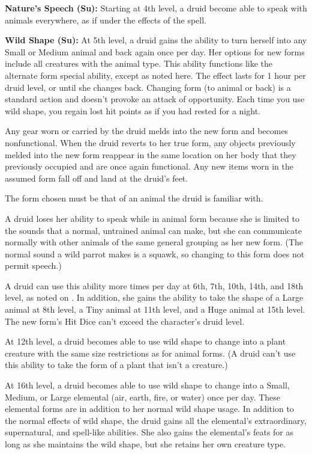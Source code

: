 \textbf{Nature's Speech (Su):} Starting at 4th level, a druid become able to speak with animals everywhere, as if under the effects of the  spell.

\textbf{Wild Shape (Su):} At 5th level, a druid gains the ability to turn herself into any Small or Medium animal and back again once per day. Her options for new forms include all creatures with the animal type. This ability functions like the alternate form special ability, except as noted here. The effect lasts for 1 hour per druid level, or until she changes back. Changing form (to animal or back) is a standard action and doesn't provoke an attack of opportunity. Each time you use wild shape, you regain lost hit points as if you had rested for a night.

Any gear worn or carried by the druid melds into the new form and becomes nonfunctional. When the druid reverts to her true form, any objects previously melded into the new form reappear in the same location on her body that they previously occupied and are once again functional. Any new items worn in the assumed form fall off and land at the druid's feet.

The form chosen must be that of an animal the druid is familiar with.

A druid loses her ability to speak while in animal form because she is limited to the sounds that a normal, untrained animal can make, but she can communicate normally with other animals of the same general grouping as her new form. (The normal sound a wild parrot makes is a squawk, so changing to this form does not permit speech.)

A druid can use this ability more times per day at 6th, 7th, 10th, 14th, and 18th level, as noted on . In addition, she gains the ability to take the shape of a Large animal at 8th level, a Tiny animal at 11th level, and a Huge animal at 15th level. The new form's Hit Dice can't exceed the character's druid level.

At 12th level, a druid becomes able to use wild shape to change into a plant creature with the same size restrictions as for animal forms. (A druid can't use this ability to take the form of a plant that isn't a creature.)

At 16th level, a druid becomes able to use wild shape to change into a Small, Medium, or Large elemental (air, earth, fire, or water) once per day. These elemental forms are in addition to her normal wild shape usage. In addition to the normal effects of wild shape, the druid gains all the elemental's extraordinary, supernatural, and spell-like abilities. She also gains the elemental's feats for as long as she maintains the wild shape, but she retains her own creature type.

